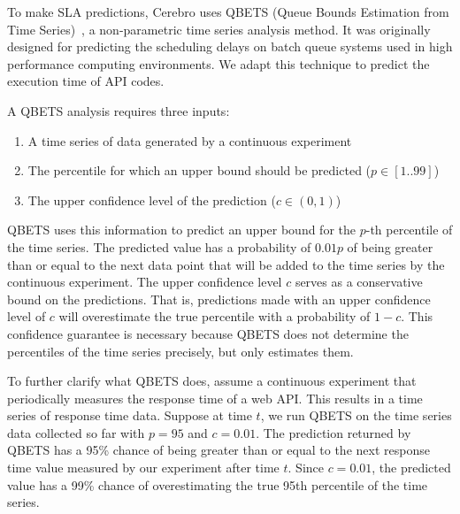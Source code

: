 To make SLA predictions, Cerebro uses QBETS (Queue Bounds Estimation from Time Series)~\cite{Nurmi:2007:QQB:1791551.1791556},
a non-parametric time series analysis method.
It was originally designed for
predicting the scheduling delays on batch queue systems used in high performance computing environments. 
We adapt this technique to predict the execution time of API codes.

A QBETS analysis requires three inputs:
\begin{enumerate}
\item A time series of data generated by a continuous experiment
\item The percentile for which an upper bound should be predicted ($p \in [1..99]$)
\item The upper confidence level of the prediction ($c \in (0,1)$)
\end{enumerate}

QBETS uses this information to predict an upper bound for the $p$-th percentile of the time series.
The predicted value has a probability of $0.01p$ of being greater than or equal to the next data point that
will be added to the time series by the continuous experiment. 
The upper confidence level $c$ serves as a conservative
bound on the predictions. That is, predictions made with an upper confidence level of $c$ will overestimate
the true percentile with a probability of $1-c$. This confidence guarantee is necessary because 
QBETS does not determine the 
percentiles of the time series precisely, but only estimates them. 

To further clarify what QBETS does, assume a continuous experiment that periodically measures the
response time of a web API. This results in a time series of response time data. Suppose at time $t$,
we run QBETS on the time series data collected so far with $p=95$ and $c=0.01$. The prediction returned
by QBETS has a 95\% chance of being greater than or equal to the next response time value measured
by our experiment after time $t$. Since $c=0.01$, the predicted value has a 99\% chance of
overestimating the true 95th percentile of the time series.

